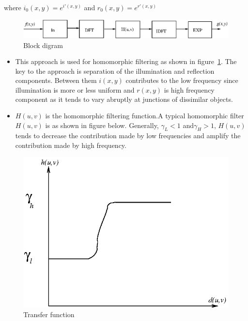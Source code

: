        where $i_{0}(x,y)=e^{i'(x,y)}$ and $r_{0}(x,y)=e^{r'(x,y)}$



\begin{figure}[h]
	\centering
\includegraphics{blockdig.eps}
\caption{Block digram}
	\label{bbb}
\end{figure}

\begin{itemize}
\item This approach is used for homomorphic filtering as shown in figure~\ref{bbb}. The key to the approach is separation of the illumination and reflection components. Between them $i(x,y)$ contributes to the low frequency since illumination is more or less uniform and $r(x,y)$ is high frequency component as it tends to vary abruptly at junctions of dissimilar objects.
\item $H(u,v)$ is the homomorphic filtering function.A typical homomorphic filter $H(u,v)$ is as shown in figure below. Generally, $\gamma_L<1$ and$\gamma_H>1$, $H(u,v)$ tends to decrease the contribution made by low frequencies and amplify the contribution made by high frequency.
\end{itemize}


\begin{figure}[htbp]
\centering
\includegraphics{graph.eps}
\caption{Transfer function}
\label{fig:graph}
\end{figure}

